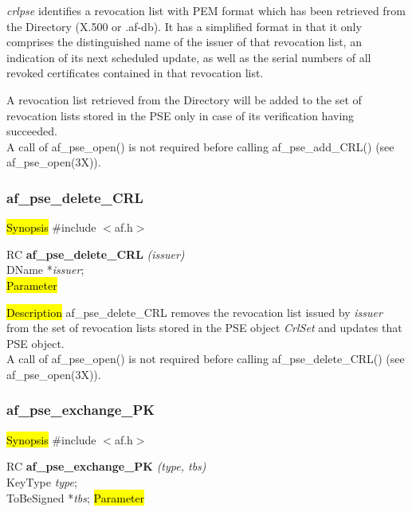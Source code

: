 {\em crlpse} identifies a revocation list with PEM format which has been retrieved from
the Directory (X.500 or .af-db). It has a simplified format in that it only comprises the distinguished
name of the issuer of that revocation list, an indication of its next scheduled update,
as well as the serial numbers of all revoked certificates contained in that revocation list.
 
A revocation list retrieved from the Directory will be added to the set of revocation lists
stored in the PSE only in case of its verification having succeeded. 
\\ [1em]
A call of af\_pse\_open() is not required before calling af\_pse\_add\_CRL()
(see af\_pse\_open(3X)).


\subsubsection{af\_pse\_delete\_CRL}
\label{af_delete_CRL}
\hl{Synopsis}
\#include $<$af.h$>$ 

RC {\bf af\_pse\_delete\_CRL} {\em (issuer)} \\
DName *{\em issuer}; \\
\hl{Parameter}

\hl{Description}
af\_pse\_delete\_CRL removes the revocation list issued by {\em issuer} from the set
of revocation lists stored in the PSE object {\em CrlSet} and updates that PSE object. 
\\ [1em]
A call of af\_pse\_open() is not required before calling af\_pse\_delete\_CRL()
(see af\_pse\_open(3X)).



\subsubsection{af\_pse\_exchange\_PK}
\label{af_change_PK}
\hl{Synopsis}
\#include $<$af.h$>$

RC {\bf af\_pse\_exchange\_PK} {\em (type, tbs)} \\
KeyType {\em type}; \\
ToBeSigned *{\em tbs};
\hl{Parameter}

